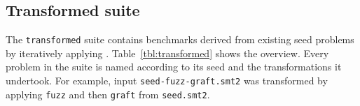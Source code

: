     


\subsection{Transformed suite}

    The \texttt{transformed} suite contains benchmarks derived from existing seed problems by iteratively applying \transformer{}. Table~\ref{tbl:transformed} shows the overview. Every problem in the suite is named according to its seed and the transformations it undertook. For example, input \texttt{seed-fuzz-graft.smt2} was transformed by applying \texttt{fuzz} and then \texttt{graft} from \texttt{seed.smt2}. 


